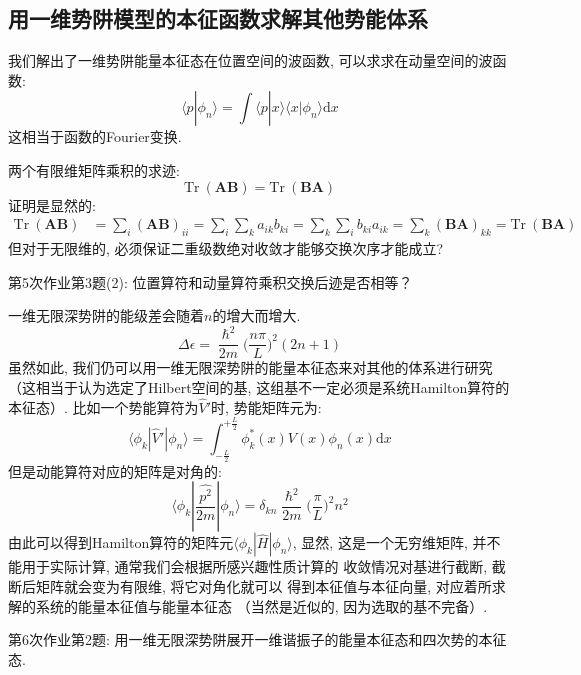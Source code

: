     \subsection{用一维势阱模型的本征函数求解其他势能体系}
        我们解出了一维势阱能量本征态在位置空间的波函数, 可以求求在动量空间的波函数:
        \[ \langle p|\phi_n \rangle = \int \langle p|x \rangle \langle x |\phi_n \rangle \mathrm{d}x \]
        这相当于函数的Fourier变换. 

        两个有限维矩阵乘积的求迹: 
        \begin{equation}
            \mathrm{Tr} \ (\bm{AB}) = \mathrm{Tr} \ (\bm{BA})
        \end{equation}
        证明是显然的: 
        \begin{equation}\begin{aligned}
            \mathrm{Tr} \ (\bm{AB}) &= \sum_i (\bm{AB})_{ii}
            = \sum_i \sum_k a_{ik}b_{ki}
            = \sum_k \sum_i b_{ki}a_{ik}
            = \sum_k \bm{(BA)}_{kk}
            = \mathrm{Tr} \ (\bm{BA})
        \end{aligned}\end{equation}
        但对于无限维的, 必须保证二重级数绝对收敛才能够交换次序才能成立?
        \begin{asg}
            第5次作业第3题(2): 位置算符和动量算符乘积交换后迹是否相等？
        \end{asg}

        \splitline

        一维无限深势阱的能级差会随着$n$的增大而增大.
        \[ \Delta \epsilon = \frac {\hslash^2}{2m} \bigg(\frac {n\pi}L \bigg)^2 (2n+1) \]
        虽然如此, 我们仍可以用一维无限深势阱的能量本征态来对其他的体系进行研究
        （这相当于认为选定了Hilbert空间的基, 这组基不一定必须是系统Hamilton算符的本征态）. 
        比如一个势能算符为$\hat{V}'$时, 势能矩阵元为: 
        \[
            \langle \phi_k | \hat{V}' | \phi_n \rangle = \int_{-\frac L2}^{+\frac L2} \phi_k^*(x) V(x) \phi_n(x) \mathrm{d}x 
        \]
        但是动能算符对应的矩阵是对角的: 
        \[
            \langle \phi_k | \frac {\hat{p^2}}{2m} | \phi_n \rangle = \delta_{kn} \frac {\hslash^2}{2m} \bigg( \frac {\pi}L \bigg)^2 n^2
        \]
        由此可以得到Hamilton算符的矩阵元$\langle\phi_k |\hat{H} |\phi_n \rangle$, 
        显然, 这是一个无穷维矩阵, 并不能用于实际计算, 通常我们会根据所感兴趣性质计算的
        收敛情况对基进行截断, 截断后矩阵就会变为有限维, 将它对角化就可以
        得到本征值与本征向量, 对应着所求解的系统的能量本征值与能量本征态
        （当然是近似的, 因为选取的基不完备）.
        \begin{asg}
            第6次作业第2题: 用一维无限深势阱展开一维谐振子的能量本征态和四次势的本征态.
        \end{asg}


